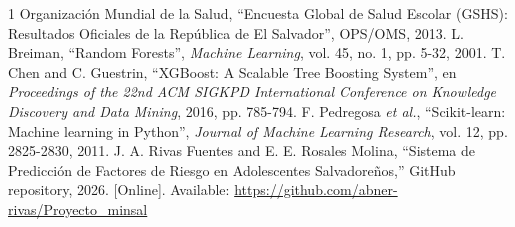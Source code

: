 \documentclass[10pt,journal,compsoc]{IEEEtran}
\begin{document}
\begin{thebibliography}{1}
Organización Mundial de la Salud, ``Encuesta Global de Salud Escolar (GSHS): Resultados Oficiales de la República de El Salvador'', OPS/OMS, 2013.
L. Breiman, ``Random Forests'', \textit{Machine Learning}, vol. 45, no. 1, pp. 5-32, 2001.
T. Chen and C. Guestrin, ``XGBoost: A Scalable Tree Boosting System'', en \textit{Proceedings of the 22nd ACM SIGKPD International Conference on Knowledge Discovery and Data Mining}, 2016, pp. 785-794.
F. Pedregosa \textit{et al.}, ``Scikit-learn: Machine learning in Python'', \textit{Journal of Machine Learning Research}, vol. 12, pp. 2825-2830, 2011.
J. A. Rivas Fuentes and E. E. Rosales Molina, ``Sistema de Predicción de Factores de Riesgo en Adolescentes Salvadoreños,'' GitHub repository, 2026. [Online]. Available: \url{https://github.com/abner-rivas/Proyecto_minsal}
\end{thebibliography}
\end{document}
